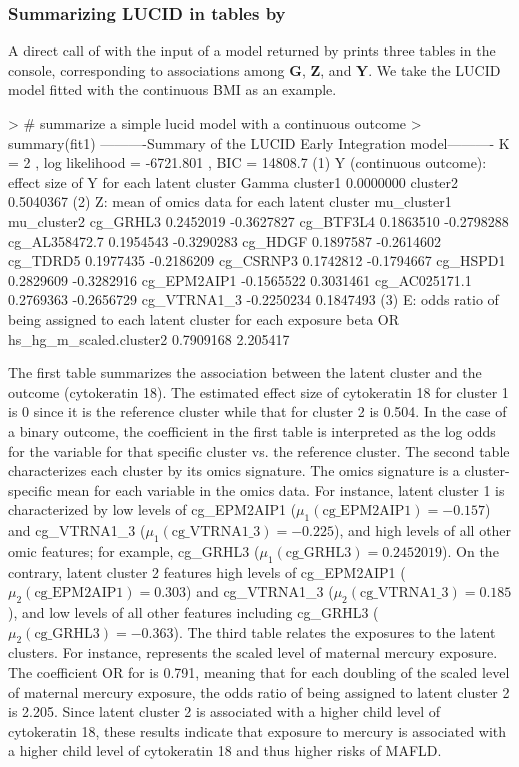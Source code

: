 \subsubsection{Summarizing LUCID in tables by } 
A direct call of  with the input of a model returned by  prints three tables in the console, corresponding to associations among $\bm G$, $\bm Z$, and $\bm Y$. We take the LUCID model fitted with the continuous BMI as an example.
\begin{example}
> # summarize a simple lucid model with a continuous outcome
> summary(fit1)
----------Summary of the LUCID Early Integration model---------- 
K =  2 , log likelihood = -6721.801 , BIC =  14808.7 
(1) Y (continuous outcome): effect size of Y for each latent cluster
             Gamma
cluster1 0.0000000
cluster2 0.5040367
(2) Z: mean of omics data for each latent cluster 
              mu_cluster1 mu_cluster2
cg_GRHL3        0.2452019  -0.3627827
cg_BTF3L4       0.1863510  -0.2798288
cg_AL358472.7   0.1954543  -0.3290283
cg_HDGF         0.1897587  -0.2614602
cg_TDRD5        0.1977435  -0.2186209
cg_CSRNP3       0.1742812  -0.1794667
cg_HSPD1        0.2829609  -0.3282916
cg_EPM2AIP1    -0.1565522   0.3031461
cg_AC025171.1   0.2769363  -0.2656729
cg_VTRNA1_3    -0.2250234   0.1847493
(3) E: odds ratio of being assigned to each latent cluster for each exposure 
                             beta       OR
hs_hg_m_scaled.cluster2 0.7909168 2.205417
\end{example}
The first table summarizes the association between the latent cluster and the outcome (cytokeratin 18). The estimated effect size of cytokeratin 18 for cluster 1 is 0 since it is the reference cluster while that for cluster 2 is 0.504. In the case of a binary outcome, the coefficient in the first table is interpreted as the log odds for the variable for that specific cluster vs. the reference cluster. The second table characterizes each cluster by its omics signature. The omics signature is a cluster-specific mean for each variable in the omics data. For instance, latent cluster 1 is characterized by low levels of cg\_EPM2AIP1 ($\mu_1 (\text{cg\_EPM2AIP1})= -0.157$) and cg\_VTRNA1\_3 ($\mu_1 (\text{cg\_VTRNA1\_3})= -0.225$), and high levels of all other omic features; for example, cg\_GRHL3 ($\mu_1 (\text{cg{\_}GRHL3})= 0.2452019$). On the contrary, latent cluster 2 features high levels of cg{\_}EPM2AIP1 ($\mu_2 (\text{cg{\_}EPM2AIP1})=  0.303$) and cg{\_}VTRNA1{\_}3 ($\mu_2 (\text{cg{\_}VTRNA1{\_}3})= 0.185$), and low levels of all other features including cg{\_}GRHL3 ($\mu_2 (\text{cg{\_}GRHL3})= -0.363$). The third table relates the exposures to the latent clusters. For instance,  represents the scaled level of maternal mercury exposure. The coefficient OR for  is 0.791, meaning that for each doubling of the scaled level of maternal mercury exposure, the odds ratio of being assigned to latent cluster 2 is 2.205. Since latent cluster 2 is associated with a higher child level of cytokeratin 18, these results indicate that exposure to mercury is associated with a higher child level of cytokeratin 18 and thus higher risks of MAFLD.
